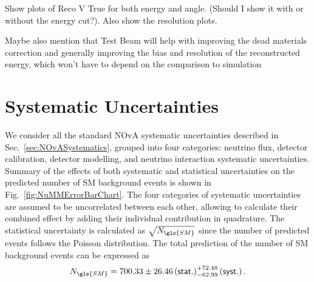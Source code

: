 Show plots of Reco V True for both energy and angle. (Should I show it with or without the energy cut?). Also show the resolution plots.

Maybe also mention that Test Beam will help with improving the dead materials correction and generally improving the bias and resolution of the reconstructed energy, which won't have to depend on the comparison to simulation
\fi
\section{Systematic Uncertainties}\label{sec:NuMMSystematics}

We consider all the standard \gls{NOvA} systematic uncertainties described in Sec.~\ref{sec:NOvASystematics}, grouped into four categories: neutrino flux, detector calibration, detector modelling, and neutrino interaction systematic uncertainties. Summary of the effects of both systematic and statistical uncertainties on the predicted number of \gls{SM} background events is shown in Fig.~\ref{fig:NuMMErrorBarChart}. The four categories of systematic uncertainties are assumed to be uncorrelated between each other, allowing to calculate their combined effect by adding their individual contribution in quadrature. The statistical uncertainty is calculated as $\sqrt{N_{\gls{SM}}}$ since the number of predicted events follows the Poisson distribution. The total prediction of the number of \gls{SM} background events can be expressed as
\begin{equation}
N_{\gls{SM}}=700.33 \pm 26.46\left(\textsf{stat.}\right) ^{+72.48}_{-62.99}\left(\textsf{syst.}\right).
\end{equation}

